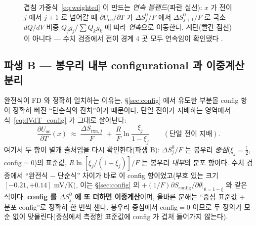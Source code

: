 \documentclass[11pt,a4paper]{article}
\newcommand{\rxn}{\mathrm{rxn}}
\newcommand{\oc}{\mathrm{oc}}
\newcommand{\config}{\mathrm{config}}
\begin{document}
\begin{figure}[t]
\centering
{}
\caption{겹침 가중식~\eqref{eq:weighted} 이 만드는 \emph{연속 블렌드}(파란 실선): $x$ 가 전이 $j$ 에서 $j{+}1$ 로 넘어갈 때 $\partial U_\oc/\partial T$ 가 $\Delta S^0_j/F$ 에서 $\Delta S^0_{j+1}/F$ 로 국소 $dQ/dV$ 비중 $Q_jg_j/\sum Q_kg_k$ 에 따라 \emph{연속}으로 이동한다. 계단(빨간 점선)이 아니다 — 수치 검증에서 전이 경계 4 곳 모두 연속임이 확인됐다 \cite{numverif2026}.}
\label{fig:blend}
\end{figure}

\subsection{파생 B — 봉우리 내부 configurational 과 이중계산 분리}
완전식이 FD 와 정확히 일치하는 이유는, \S\ref{sec:config} 에서 유도한 부분몰 config 항이 정확히 빠진
``단순식의 잔차''이기 때문이다. 단일 전이가 지배하는 영역에서 식~\eqref{eq:dVdT_config} 가 그대로 살아난다:
\begin{equation}
\frac{\partial U_\oc}{\partial T}(x)\;\approx\;\frac{\Delta S_{\rxn,j}}{F}\;+\;\frac{R}{F}\ln\!\frac{\xi_j}{1-\xi_j}
\qquad(\text{단일 전이 지배}).
\label{eq:single_config}
\end{equation}
여기서 두 항이 별개 출처임을 다시 확인한다(파생 B): $\Delta S^0_j/F$ 는 봉우리 \emph{중심}($\xi_j=\tfrac12$,
config$=0$)의 표준값, $R\ln[\xi_j/(1-\xi_j)]/F$ 는 봉우리 \emph{내부}의 분포 항이다. 수치 검증에서 ``완전식
$-$ 단순식'' 차이가 바로 이 config 항이었고(부호 있는 크기 $[-0.21,+0.14]$ mV/K), 이는 \S\ref{sec:config} 의
$+(1/F)\partial S_\config/\partial\theta|_{\theta=1-\xi}$ 와 같은 식이다. \textbf{config 를 $\Delta S^0_j$ 에 또 더하면
이중계산}이며, 올바른 분해는 ``중심 표준값 $+$ 분포 config''로 정확히 한 번씩 센다. 봉우리 중심에서 config$=0$
이므로 두 정의가 모순 없이 맞물린다(중심에서 측정한 표준값에 config 가 겹쳐 들어가지 않는다).
\end{document}
